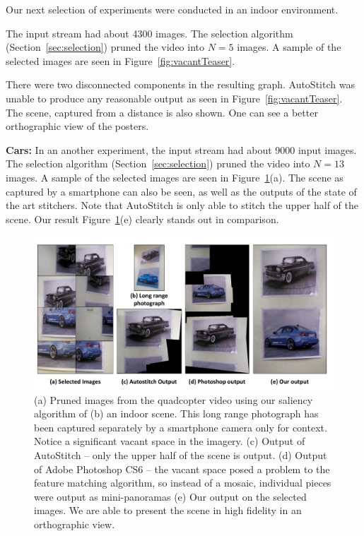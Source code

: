 Our next selection of experiments were conducted in an indoor
environment.  

The input stream had about 4300
images. The selection algorithm (Section~\ref{sec:selection}) pruned the video
into $N=5$ images. A sample of the selected images are seen in Figure~\ref{fig:vacantTeaser}.

There were two disconnected components in the resulting graph.
AutoStitch was unable to produce any reasonable output as seen in
Figure~\ref{fig:vacantTeaser}.  The scene, captured from a distance is also
shown.  One can see a better orthographic view of the posters.

\textbf{Cars:}
In an another experiment, the input stream had about 9000 input
images.  The selection algorithm (Section~\ref{sec:selection}) pruned
the video into $N=13$ images. A sample of the selected images are seen
in Figure~\ref{fig:indoor_results}(a).  The scene as captured by a
smartphone can also be seen, as well as the outputs of the state of
the art stitchers. Note that AutoStitch is only able to stitch the
upper half of the scene.  Our result
Figure~\ref{fig:indoor_results}(e) clearly stands out in comparison.

\begin{figure}
\centering
\includegraphics[width=\linewidth]{figures/vacantSpaces/indoor_results}
\caption[Result: Cars]{ (a) Pruned images from the quadcopter video using our
  saliency algorithm of (b) an indoor scene. This long range photograph
  has been captured separately by a smartphone camera only for
  context. Notice a significant vacant space in the imagery.  (c)
  Output of AutoStitch -- only the upper half of the scene is output.
  (d) Output of Adobe Photoshop CS6 -- the vacant space posed a problem to the
  feature matching algorithm, so instead of a mosaic, individual
  pieces were output as mini-panoramas (e) Our output on the selected
  images. We are able to present the scene in high fidelity in an
  orthographic view.}
\label{fig:indoor_results}
\end{figure}

